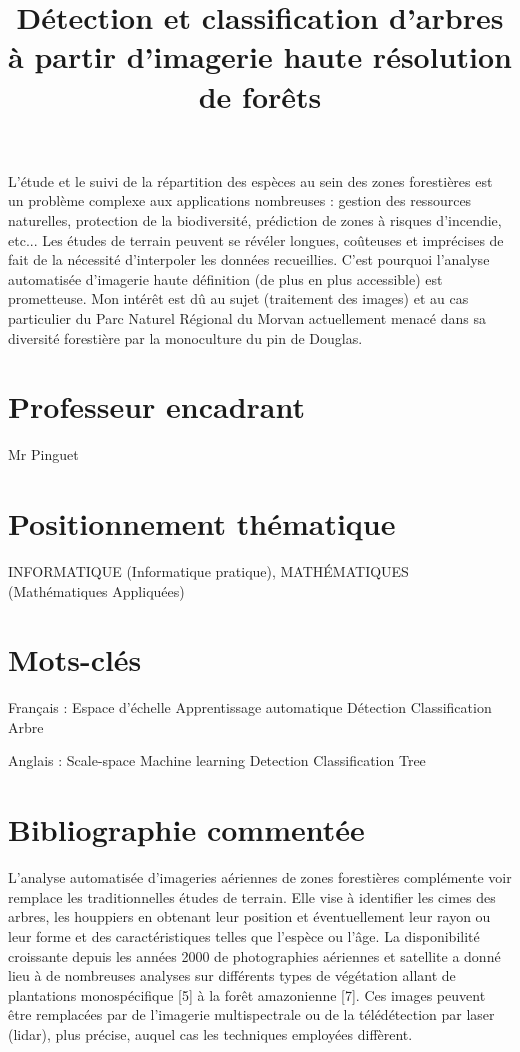 \documentclass{article}
\title{Détection et classification d'arbres à partir d'imagerie haute résolution de forêts}
\begin{document}
\maketitle

L'étude et le suivi de la répartition des espèces au sein des zones forestières est un problème complexe aux applications nombreuses : gestion des ressources naturelles, protection de la biodiversité, prédiction de zones à risques d'incendie, etc... 
Les études de terrain peuvent se révéler longues, coûteuses et imprécises de fait de la nécessité d'interpoler les données recueillies. 
C'est pourquoi l'analyse automatisée d'imagerie haute définition (de plus en plus accessible) est prometteuse.
Mon intérêt est dû au sujet (traitement des images) et au cas particulier du Parc Naturel Régional du Morvan actuellement menacé dans sa diversité forestière par la monoculture du pin de Douglas.

\section{Professeur encadrant}
Mr Pinguet

\section{Positionnement thématique}
INFORMATIQUE (Informatique pratique), MATHÉMATIQUES (Mathématiques Appliquées)

\section{Mots-clés}
Français :
Espace d'échelle
Apprentissage automatique 
Détection
Classification 
Arbre

Anglais :
Scale-space
Machine learning
Detection
Classification
Tree

\section{Bibliographie commentée}

L'analyse automatisée d'imageries aériennes de zones forestières complémente voir remplace les traditionnelles études de terrain. Elle vise à identifier les cimes des arbres, les houppiers en obtenant leur position et éventuellement leur rayon ou leur forme et des caractéristiques telles que l'espèce ou l'âge. La disponibilité croissante depuis les années 2000 de photographies aériennes et satellite a donné lieu à de nombreuses analyses sur différents types de végétation allant de plantations monospécifique [5] à la forêt amazonienne [7]. Ces images peuvent être remplacées par de l'imagerie multispectrale ou de la télédétection par laser (lidar), plus précise, auquel cas les techniques employées diffèrent.
\end{document}
